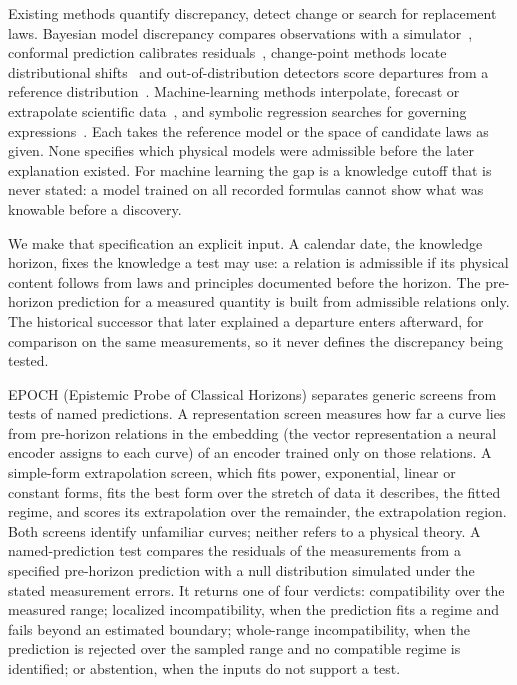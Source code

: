 \documentclass{article}
\begin{document}
Existing methods quantify discrepancy, detect change or search for replacement laws. Bayesian model discrepancy compares observations with a simulator~\cite{kennedy2001bayesian}, conformal prediction calibrates residuals~\cite{angelopoulos2023conformal}, change-point methods locate distributional shifts~\cite{page1954cusum} and out-of-distribution detectors score departures from a reference distribution~\cite{hendrycks2017baseline}. Machine-learning methods interpolate, forecast or extrapolate scientific data~\cite{wang2023discovery,xu2021extrapolate}, and symbolic regression searches for governing expressions~\cite{guimera2020bayesian,udrescu2020feynman}. Each takes the reference model or the space of candidate laws as given. None specifies which physical models were admissible before the later explanation existed. For machine learning the gap is a knowledge cutoff that is never stated: a model trained on all recorded formulas cannot show what was knowable before a discovery.

We make that specification an explicit input. A calendar date, the knowledge horizon, fixes the knowledge a test may use: a relation is admissible if its physical content follows from laws and principles documented before the horizon. The pre-horizon prediction for a measured quantity is built from admissible relations only. The historical successor that later explained a departure enters afterward, for comparison on the same measurements, so it never defines the discrepancy being tested.

EPOCH (Epistemic Probe of Classical Horizons) separates generic screens from tests of named predictions. A representation screen measures how far a curve lies from pre-horizon relations in the embedding (the vector representation a neural encoder assigns to each curve) of an encoder trained only on those relations. A simple-form extrapolation screen, which fits power, exponential, linear or constant forms, fits the best form over the stretch of data it describes, the fitted regime, and scores its extrapolation over the remainder, the extrapolation region. Both screens identify unfamiliar curves; neither refers to a physical theory. A named-prediction test compares the residuals of the measurements from a specified pre-horizon prediction with a null distribution simulated under the stated measurement errors. It returns one of four verdicts: compatibility over the measured range; localized incompatibility, when the prediction fits a regime and fails beyond an estimated boundary; whole-range incompatibility, when the prediction is rejected over the sampled range and no compatible regime is identified; or abstention, when the inputs do not support a test.
\end{document}
